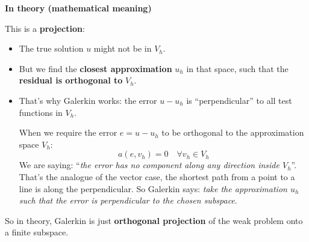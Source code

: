 \highspace
\begin{flushleft}
    \textcolor{Green3}{ \textbf{In theory (mathematical meaning)}}
\end{flushleft}
This is a \textbf{projection}:
\begin{itemize}
    \item The true solution $u$ might not be in $V_h$.
    \item But we find the \textbf{closest approximation} $u_h$ in that space, such that the \textbf{residual is orthogonal to} $V_h$.
    \item That's why Galerkin works: the error $u-u_h$ is ``perpendicular'' to all test functions in $V_h$.
    
    \highspace
    When we require the error $e = u - u_{h}$ to be orthogonal to the approximation space $V_{h}$:
    \begin{equation*}
        a(e, v_h) = 0 \quad \forall v_h \in V_h
    \end{equation*}
    We are saying: ``\emph{the error has no component along any direction inside $V_{h}$}''. That's the analogue of the vector case, the shortest path from a point to a line is along the perpendicular. So Galerkin says: \emph{take the approximation $u_{h}$ such that the error is perpendicular to the chosen subspace}.
\end{itemize}
So in theory, Galerkin is just \textbf{orthogonal projection} of the weak problem onto a finite subspace.

